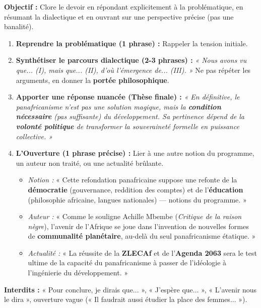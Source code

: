 \documentclass[11pt]{article}
\newcommand{\cle}[1]{{\popxbold\color{popdark}#1}}
\begin{document}
\begin{methode}
\textbf{Objectif :} Clore le devoir en répondant explicitement à la problématique, en résumant la dialectique et en ouvrant sur une perspective précise (pas une banalité).
\begin{enumerate}
    \item \textbf{Reprendre la problématique (1 phrase) :} Rappeler la tension initiale.
    \item \textbf{Synthétiser le parcours dialectique (2-3 phrases) :} \emph{« Nous avons vu que... (I), mais que... (II), d'où l'émergence de... (III). »} Ne pas répéter les arguments, en donner la \textbf{portée philosophique}.
    \item \textbf{Apporter une réponse nuancée (Thèse finale) :} \emph{« En définitive, le panafricanisme n'est pas une solution magique, mais la \textbf{condition nécessaire} (pas suffisante) du développement. Sa pertinence dépend de la \textbf{volonté politique} de transformer la souveraineté formelle en puissance collective. »}
    \item \textbf{L'Ouverture (1 phrase précise) :} Lier à une autre notion du programme, un auteur non traité, ou une actualité brûlante.
        \begin{itemize}
            \item \emph{Notion :} « Cette refondation panafricaine suppose une refonte de la \textbf{démocratie} (gouvernance, reddition des comptes) et de l'\textbf{éducation} (philosophie africaine, langues nationales) — notions du programme. »
            \item \emph{Auteur :} « Comme le souligne \cle{Achille Mbembe} (\emph{Critique de la raison nègre}), l'avenir de l'Afrique se joue dans l'invention de nouvelles formes de \textbf{communalité planétaire}, au-delà du seul panafricanisme étatique. »
            \item \emph{Actualité :} « La réussite de la \textbf{ZLECAf} et de l'\textbf{Agenda 2063} sera le test ultime de la capacité du panafricanisme à passer de l'idéologie à l'ingénierie du développement. »
        \end{itemize}
\end{enumerate}
\textbf{Interdits :} « Pour conclure, je dirais que... », « J'espère que... », « L'avenir nous le dira », ouverture vague (« Il faudrait aussi étudier la place des femmes... »).
\end{methode}
\end{document}

